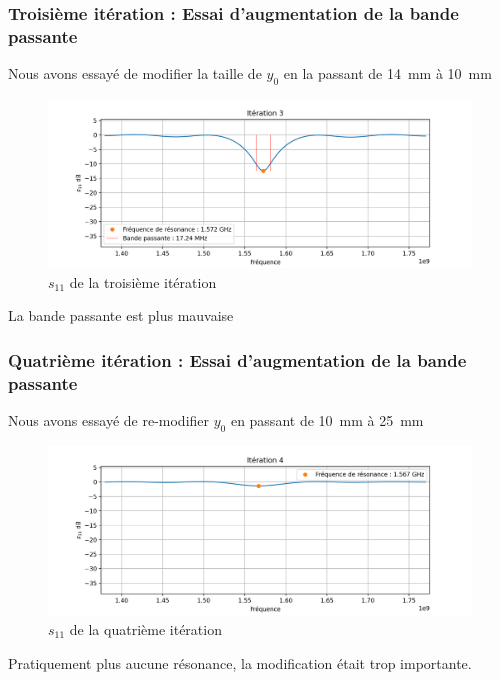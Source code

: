 \documentclass[Deriaz_Traiber_Labo02.tex]{subfiles}
\begin{document}
\subsubsection{Troisième itération : Essai d'augmentation de la bande passante}
Nous avons essayé de modifier la taille de $y_0$ en la passant de \SI{14}{\milli\meter} à \SI{10}{\milli\meter}
\begin{figure}[H]
\centering
\includegraphics[width=15cm]{../Calculs/run_id_fr4_3.png}
\caption[caption]{$s_{11}$ de la troisième itération}
\end{figure}
La bande passante est plus mauvaise
\subsubsection{Quatrième itération : Essai d'augmentation de la bande passante}
Nous avons essayé de re-modifier $y_0$ en passant de \SI{10}{\milli\meter} à \SI{25}{\milli\meter}
\begin{figure}[H]
\centering
\includegraphics[width=15cm]{../Calculs/run_id_fr4_4.png}
\caption[caption]{$s_{11}$ de la quatrième itération}
\end{figure}
Pratiquement plus aucune résonance, la modification était trop importante.
\pagebreak
\end{document}
